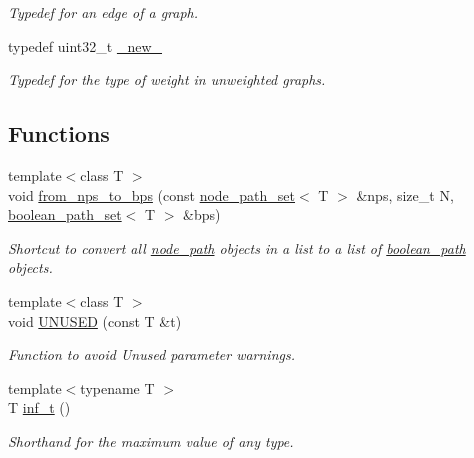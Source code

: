 \begin{DoxyCompactItemize}
\begin{DoxyCompactList}\small\item\em Typedef for an edge of a graph. \end{DoxyCompactList}\item 
typedef uint32\+\_\+t \hyperlink{namespacelgraph_1_1utils_a2c84bfde888c42ab3ad6b2cb8a364240}{\+\_\+new\+\_\+}\hypertarget{namespacelgraph_1_1utils_a2c84bfde888c42ab3ad6b2cb8a364240}{}\label{namespacelgraph_1_1utils_a2c84bfde888c42ab3ad6b2cb8a364240}

\begin{DoxyCompactList}\small\item\em Typedef for the type of weight in unweighted graphs. \end{DoxyCompactList}\end{DoxyCompactItemize}
\subsection*{Functions}
\begin{DoxyCompactItemize}
\item 
{\footnotesize template$<$class T $>$ }\\void \hyperlink{namespacelgraph_1_1utils_ab15212bece1e1a0f3a8f98b26f2a33c8}{from\+\_\+nps\+\_\+to\+\_\+bps} (const \hyperlink{namespacelgraph_1_1utils_a723c115f9865edfab11a90377b9abef4}{node\+\_\+path\+\_\+set}$<$ T $>$ \&nps, size\+\_\+t N, \hyperlink{namespacelgraph_1_1utils_aaf50131e15d771a45620336d6e7a77f8}{boolean\+\_\+path\+\_\+set}$<$ T $>$ \&bps)
\begin{DoxyCompactList}\small\item\em Shortcut to convert all \hyperlink{classlgraph_1_1utils_1_1node__path}{node\+\_\+path} objects in a list to a list of \hyperlink{classlgraph_1_1utils_1_1boolean__path}{boolean\+\_\+path} objects. \end{DoxyCompactList}\item 
{\footnotesize template$<$class T $>$ }\\void \hyperlink{namespacelgraph_1_1utils_a02e9a521f6566b3bd3570cfec6d19db1}{U\+N\+U\+S\+ED} (const T \&t)\hypertarget{namespacelgraph_1_1utils_a02e9a521f6566b3bd3570cfec6d19db1}{}\label{namespacelgraph_1_1utils_a02e9a521f6566b3bd3570cfec6d19db1}

\begin{DoxyCompactList}\small\item\em Function to avoid \textquotesingle{}Unused parameter\textquotesingle{} warnings. \end{DoxyCompactList}\item 
{\footnotesize template$<$typename T $>$ }\\T \hyperlink{namespacelgraph_1_1utils_af61dd7000b978d1a5d6ba67166f7da35}{inf\+\_\+t} ()\hypertarget{namespacelgraph_1_1utils_af61dd7000b978d1a5d6ba67166f7da35}{}\label{namespacelgraph_1_1utils_af61dd7000b978d1a5d6ba67166f7da35}

\begin{DoxyCompactList}\small\item\em Shorthand for the maximum value of any type. \end{DoxyCompactList}\end{DoxyCompactItemize}
